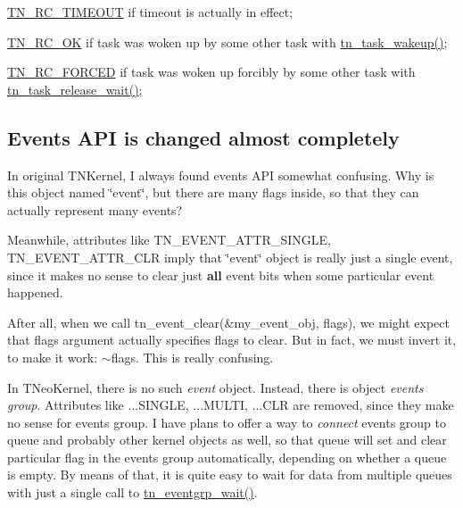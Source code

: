 \begin{DoxyItemize}
\item {\ttfamily \hyperlink{tn__common_8h_aa43bd3da1ad4c1e61224b5f23b369876a5b4d73fde6b5d1c9579c02e6aafce1fb}{T\+N\+\_\+\+R\+C\+\_\+\+T\+I\+M\+E\+O\+U\+T}} if timeout is actually in effect;
\item {\ttfamily \hyperlink{tn__common_8h_aa43bd3da1ad4c1e61224b5f23b369876afb291924237186f5765865256c75e639}{T\+N\+\_\+\+R\+C\+\_\+\+O\+K}} if task was woken up by some other task with {\ttfamily \hyperlink{tn__tasks_8h_abb88bc8b1cec6b82e7b6e2e90d0e155a}{tn\+\_\+task\+\_\+wakeup()}};
\item {\ttfamily \hyperlink{tn__common_8h_aa43bd3da1ad4c1e61224b5f23b369876ae5cbacb0fb01805c9003046c08bf4356}{T\+N\+\_\+\+R\+C\+\_\+\+F\+O\+R\+C\+E\+D}} if task was woken up forcibly by some other task with {\ttfamily \hyperlink{tn__tasks_8h_ae90ecdbd7d87d050c2c98ec775e6efc7}{tn\+\_\+task\+\_\+release\+\_\+wait()}};
\end{DoxyItemize}\hypertarget{tnkernel_diff_tnkernel_diff_event}{}\subsection{Events A\+P\+I is changed almost completely}\label{tnkernel_diff_tnkernel_diff_event}
In original T\+N\+Kernel, I always found events A\+P\+I somewhat confusing. Why is this object named \char`\"{}event\char`\"{}, but there are many flags inside, so that they can actually represent many events?

Meanwhile, attributes like {\ttfamily T\+N\+\_\+\+E\+V\+E\+N\+T\+\_\+\+A\+T\+T\+R\+\_\+\+S\+I\+N\+G\+L\+E}, {\ttfamily T\+N\+\_\+\+E\+V\+E\+N\+T\+\_\+\+A\+T\+T\+R\+\_\+\+C\+L\+R} imply that \char`\"{}event\char`\"{} object is really just a single event, since it makes no sense to clear just {\bfseries all} event bits when some particular event happened.

After all, when we call {\ttfamily tn\+\_\+event\+\_\+clear(\&my\+\_\+event\+\_\+obj, flags)}, we might expect that {\ttfamily flags} argument actually specifies flags to clear. But in fact, we must invert it, to make it work\+: {\ttfamily $\sim$flags}. This is really confusing.

In T\+Neo\+Kernel, there is no such {\itshape event} object. Instead, there is object {\itshape events group}. Attributes like {\ttfamily ...S\+I\+N\+G\+L\+E}, {\ttfamily ...M\+U\+L\+T\+I}, {\ttfamily ...C\+L\+R} are removed, since they make no sense for events group. I have plans to offer a way to {\itshape connect} events group to queue and probably other kernel objects as well, so that queue will set and clear particular flag in the events group automatically, depending on whether a queue is empty. By means of that, it is quite easy to wait for data from multiple queues with just a single call to {\ttfamily \hyperlink{tn__eventgrp_8h_aa905d986d188d4a0cc2f3974aad04896}{tn\+\_\+eventgrp\+\_\+wait()}}.

